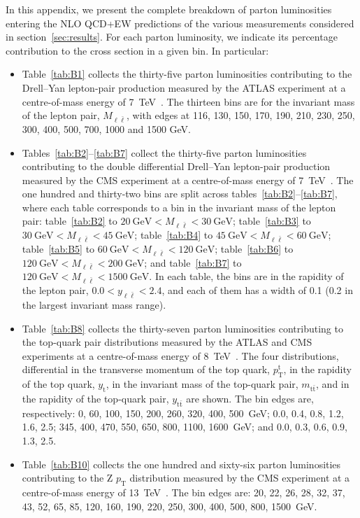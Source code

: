 In this appendix, we present the complete breakdown of parton luminosities
entering the NLO QCD+EW predictions of the various measurements
considered in section~\ref{sec:results}. For each parton luminosity,
we indicate its percentage contribution to the cross section in a given bin.
In particular:
\begin{itemize}
\item Table~\ref{tab:B1} collects the thirty-five parton luminosities
  contributing to the Drell--Yan lepton-pair production measured by the
  ATLAS experiment at a centre-of-mass energy of
  \SI{7}{\tera\electronvolt}~\cite{Aad:2013iua}.
  The thirteen bins are for the invariant mass of the lepton pair,
  $M_{\ell\bar\ell}$, with edges at 116, 130, 150, 170, 190,
  210, 230, 250, 300, 400, 500, 700, 1000 and 1500 GeV.
\item Tables~\ref{tab:B2}--\ref{tab:B7} collect the thirty-five parton
  luminosities contributing to the double differential Drell--Yan lepton-pair
  production measured by the CMS experiment at a centre-of-mass energy of
  \SI{7}{\tera\electronvolt}~\cite{Aad:2013iua}. The one hundred and thirty-two
  bins are split across tables~\ref{tab:B2}--\ref{tab:B7}, where each table
  corresponds to a bin in the invariant mass of the lepton pair:
  table~\ref{tab:B2} to  $\SI{20}{\giga\electronvolt}<M_{\ell\bar\ell}<\SI{30}{\giga\electronvolt}$; table~\ref{tab:B3} to  $\SI{30}{\giga\electronvolt}<M_{\ell\bar\ell}<\SI{45}{\giga\electronvolt}$; table~\ref{tab:B4} to  $\SI{45}{\giga\electronvolt}<M_{\ell\bar\ell}<\SI{60}{\giga\electronvolt}$; table~\ref{tab:B5} to  $\SI{60}{\giga\electronvolt}<M_{\ell\bar\ell}<\SI{120}{\giga\electronvolt}$; table~\ref{tab:B6} to $\SI{120}{\giga\electronvolt}<M_{\ell\bar\ell}<\SI{200}{\giga\electronvolt}$; and table~\ref{tab:B7} to $\SI{120}{\giga\electronvolt}<M_{\ell\bar\ell}<\SI{1500}{\giga\electronvolt}$. In each table, the bins are in the rapidity of the lepton pair, $0.0<y_{\ell\bar\ell}<2.4$, and each of them has a width of 0.1 (0.2 in the largest invariant mass range).
\item Table~\ref{tab:B8} collects the thirty-seven parton luminosities
  contributing to the top-quark pair distributions measured by the ATLAS and
  CMS experiments at a centre-of-mass energy of
  \SI{8}{\tera\electronvolt}~\cite{Aad:2015mbv,Khachatryan:2015oqa}.
  The four distributions, differential in the transverse momentum of the top
  quark, $p_\mathrm{T}^\mathrm{t}$, in the rapidity of the top quark,
  $y_\mathrm{t}$, in the invariant mass of the top-quark pair,
  $m_{\mathrm{t}\bar{\mathrm{t}}}$, and in the rapidity of the top-quark pair,
  $y_{\mathrm{t}\bar{\mathrm{t}}}$ are shown. The bin edges are, respectively:
  0, 60, 100, 150, 200, 260, 320, 400, 500~GeV; 0.0, 0.4, 0.8, 1.2, 1.6, 2.5;
  345, 400, 470, 550, 650, 800, 1100, 1600~GeV;
  and 0.0, 0.3, 0.6, 0.9, 1.3, 2.5.
\item Table~\ref{tab:B10} collects the one hundred and sixty-six
  parton luminosities contributing to the Z $p_{\mathrm{T}}$ distribution
  measured by the CMS experiment at a centre-of-mass energy of
  \SI{13}{\tera\electronvolt}~\cite{Sirunyan:2019bzr}. The bin edges are:
  20, 22, 26, 28, 32, 37, 43, 52, 65, 85, 120, 160, 190, 220, 250, 300,
  400, 500, 800, 1500~GeV.
\end{itemize}
